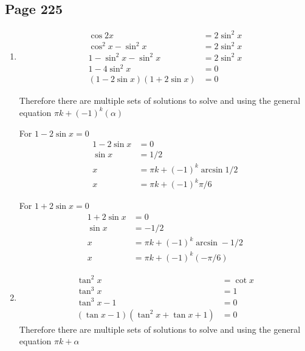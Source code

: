 \documentclass{article}
\newenvironment{solutions}[1]
{\subsection*{#1}
 \begin{enumerate}[leftmargin=1.5em]}
{\end{enumerate}}
\newcommand{\solution}{\item}
\begin{document}
\begin{solutions}{Page 225}
Therefore there are multiple sets of solutions to solve and using the general equation $\pi k + (\alpha)$

For $\tan x +2 =0$
\begin{align*}
    \tan x +2 &= 0\\
    \tan x &= -2\\
     x &= \pi k + \arctan -2
\end{align*}

For $\tan x -2 =0$
\begin{align*}
    \tan x -2 &= 0\\
    \tan x &= 2\\
     x &= \pi k + \arctan 2
\end{align*}
\solution
\begin{align*}
    \cos 2x &= 2\sin^2 x\\
    \cos^2 x - \sin^2 x &= 2\sin^2 x\\
    1-\sin^2 x -\sin^2 x &= 2\sin^2 x\\
    1 - 4\sin^2 x &=0\\
    (1-2\sin x)(1+2\sin x) &=0
\end{align*}

Therefore there are multiple sets of solutions to solve and using the general equation $\pi k + (-1)^k (\alpha)$

For $1-2\sin x =0$
\begin{align*}
    1-2\sin x &=0\\
    \sin x &= 1/2\\
    x &= \pi k + (-1)^k \arcsin 1/2\\
    x &= \pi k + (-1)^k \pi/6
\end{align*}

For $1+2\sin x =0$
\begin{align*}
    1+2\sin x &=0\\
    \sin x &= -1/2\\
    x &= \pi k + (-1)^k \arcsin -1/2\\
    x &= \pi k + (-1)^k (-\pi/6)
\end{align*}
\solution
\begin{align*}
    \tan^2 x &= \cot x\\
    \tan^3 x &= 1\\
    \tan^3 x -1 &= 0\\
    (\tan x -1)(\tan^2 x + \tan x +1)&= 0
\end{align*}
Therefore there are multiple sets of solutions to solve and using the general equation $\pi k + \alpha$


\end{solutions}
\end{document}
